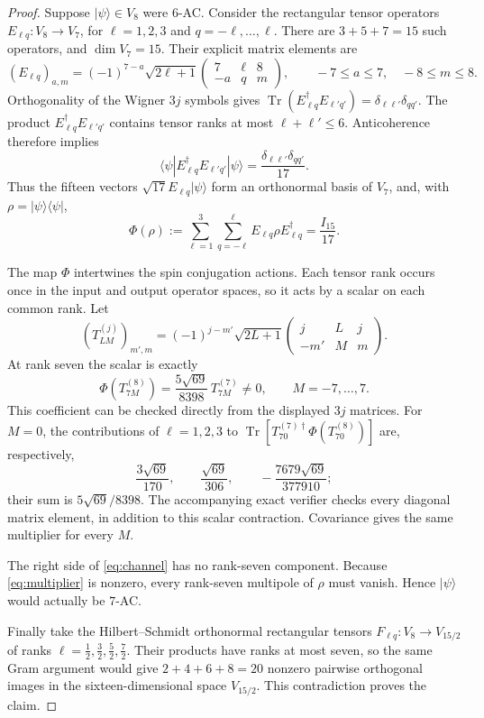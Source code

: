 \documentclass[11pt]{article}
\newcommand{\Tr}{\operatorname{Tr}}
\begin{document}
\begin{proof}
Suppose $|\psi\rangle\in V_8$ were $6$-AC.  Consider the rectangular
tensor operators $E_{\ell q}:V_8\to V_7$, for $\ell=1,2,3$ and
$q=-\ell,\ldots,\ell$.  There are $3+5+7=15$ such operators, and
$\dim V_7=15$.  Their explicit matrix elements are
\[
 (E_{\ell q})_{a,m}=(-1)^{7-a}\sqrt{2\ell+1}
 \begin{pmatrix}7&\ell&8\\-a&q&m\end{pmatrix},
 \qquad -7\le a\le7,\quad -8\le m\le8.
\]
Orthogonality of the Wigner $3j$ symbols gives
$\Tr(E_{\ell q}^\dagger E_{\ell' q'})=
\delta_{\ell\ell'}\delta_{qq'}$.
The product $E_{\ell q}^\dagger E_{\ell' q'}$ contains tensor ranks at
most $\ell+\ell'\le6$.  Anticoherence therefore implies
\[
 \langle\psi|E_{\ell q}^\dagger E_{\ell' q'}|\psi\rangle
 =\frac{\delta_{\ell\ell'}\delta_{qq'}}{17}.
\]
Thus the fifteen vectors $\sqrt{17}E_{\ell q}|\psi\rangle$ form an
orthonormal basis of $V_7$, and, with $\rho=|\psi\rangle\langle\psi|$,
\begin{equation}\label{eq:channel}
 \Phi(\rho):=\sum_{\ell=1}^{3}\sum_{q=-\ell}^{\ell}
 E_{\ell q}\rho E_{\ell q}^\dagger=\frac{I_{15}}{17}.
\end{equation}

The map $\Phi$ intertwines the spin conjugation actions.  Each tensor
rank occurs once in the input and output operator spaces, so it acts by
a scalar on each common rank.  Let
\[
 (T^{(j)}_{LM})_{m',m}=(-1)^{j-m'}\sqrt{2L+1}
 \begin{pmatrix}j&L&j\\-m'&M&m\end{pmatrix}.
\]
At rank seven the scalar is exactly
\begin{equation}\label{eq:multiplier}
 \Phi(T^{(8)}_{7M})=
 \frac{5\sqrt{69}}{8398}\,T^{(7)}_{7M}\ne0,
 \qquad M=-7,\ldots,7.
\end{equation}
This coefficient can be checked directly from the displayed $3j$
matrices.  For $M=0$, the contributions of $\ell=1,2,3$ to
$\Tr[T^{(7)\dagger}_{70}\Phi(T^{(8)}_{70})]$ are, respectively,
\[
 \frac{3\sqrt{69}}{170},\qquad
 \frac{\sqrt{69}}{306},\qquad
 -\frac{7679\sqrt{69}}{377910};
\]
their sum is $5\sqrt{69}/8398$.  The accompanying exact verifier checks
every diagonal matrix element, in addition to this scalar contraction.
Covariance gives the same multiplier for every $M$.

The right side of \eqref{eq:channel} has no rank-seven component.
Because \eqref{eq:multiplier} is nonzero, every rank-seven multipole of
$\rho$ must vanish.  Hence $|\psi\rangle$ would actually be $7$-AC.

Finally take the Hilbert--Schmidt orthonormal rectangular tensors
$F_{\ell q}:V_8\to V_{15/2}$ of ranks
$\ell=\tfrac12,\tfrac32,\tfrac52,\tfrac72$.  Their products have ranks
at most seven, so the same Gram argument would give
$2+4+6+8=20$ nonzero pairwise orthogonal images in the
sixteen-dimensional space $V_{15/2}$.  This contradiction proves the claim.
\end{proof}
\end{document}
